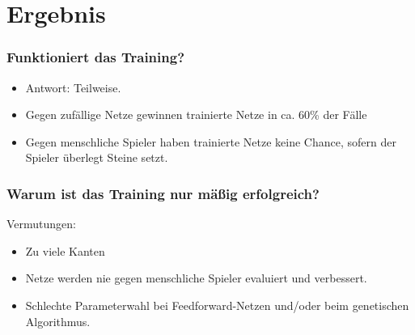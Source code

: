 \section{Ergebnis}

\begin{frame}
    \frametitle{Funktioniert das Training?}
    \begin{itemize}
    \item Antwort: Teilweise.
    \item Gegen zufällige Netze gewinnen trainierte Netze in ca. 60\% der Fälle
    \item Gegen menschliche Spieler haben trainierte Netze keine Chance, sofern der Spieler überlegt Steine setzt.
    \end{itemize}

\end{frame}
\begin{frame}
    \frametitle{Warum ist das Training nur mäßig erfolgreich?}
    Vermutungen: 
    \begin{itemize}
    \item Zu viele Kanten
    \item Netze werden nie gegen menschliche Spieler evaluiert und verbessert.
    \item Schlechte Parameterwahl bei Feedforward-Netzen und/oder beim genetischen Algorithmus.
    \end{itemize}

\end{frame}
